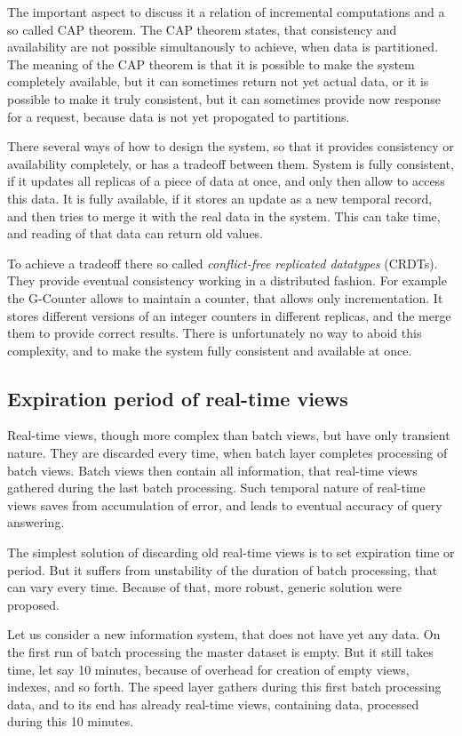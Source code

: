 The important aspect to discuss it a relation of incremental computations and a so called CAP theorem.
The CAP theorem states, that consistency and availability are not possible simultanously to achieve, when data is partitioned.
The meaning of the CAP theorem is that it is possible to make the system completely available, but it can sometimes return not yet actual data, or it is possible to make it truly consistent, but it can sometimes provide now response for a request, because data is not yet propogated to partitions.

There several ways of how to design the system, so that it provides consistency or availability completely, or has a tradeoff between them.
System is fully consistent, if it updates all replicas of a piece of data at once, and only then allow to access this data.
It is fully available, if it stores an update as a new temporal record, and then tries to merge it with the real data in the system.
This can take time, and reading of that data can return old values.

To achieve a tradeoff there so called \textit{conflict-free replicated datatypes} (CRDTs).
They provide eventual consistency working in a distributed fashion.
For example the G-Counter allows to maintain a counter, that allows only incrementation.
It stores different versions of an integer counters in different replicas, and the merge them to provide correct results.
There is unfortunately no way to aboid this complexity, and to make the system fully consistent and available at once.

\subsection{Expiration period of real-time views}

Real-time views, though more complex than batch views, but have only transient nature.
They are discarded every time, when batch layer completes processing of batch views.
Batch views then contain all information, that real-time views gathered during the last batch processing. 
Such temporal nature of real-time views saves from accumulation of error, and leads to eventual accuracy of query answering.

The simplest solution of discarding old real-time views is to set expiration time or period.
But it suffers from unstability of the duration of batch processing, that can vary every time.
Because of that, more robust, generic solution were proposed.

Let us consider a new information system, that does not have yet any data.
On the first run of batch processing the master dataset is empty.
But it still takes time, let say 10 minutes, because of overhead for creation of empty views, indexes, and so forth.
The speed layer gathers during this first batch processing data, and to its end has already real-time views, containing data, processed during this 10 minutes.

